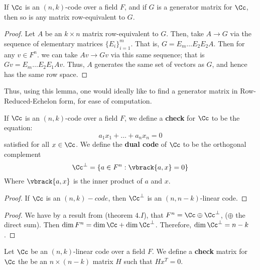 \begin{lemma}\label{2.1.1}
    If $\Cc$ is an  $(n,k)$-code over a field $F$, and if  $G$ is a generator
    matrix for  $\Cc$, then so is any matrix row-equivalent to  $G$.
\end{lemma}
\begin{proof}
    Let $A$ be an  $k \times n$ matrix row-equivalent to $G$. Then, take  $A
    \rightarrow G$ via the sequence of elementary matrices $\{E_i\}_{i=1}^m$.
    That is, $G=E_m \dots E_2E_2A$. Then for any $v \in F^n$. we can take $Av
    \rightarrow Gv$ via this same sequence; that is  $Gv=E_m \dots E_2E_1Av$.
    Thus, $A$ generates the same set of vectors as  $G$, and hence has the same
    row space.
\end{proof}
\begin{remark}
    Thus, using this lemma, one would ideally like to find a generator matrix in
    Row-Reduced-Echelon form, for ease of computation.
\end{remark}

\begin{definition}
    If $\Cc$ is an  $(n,k)$-code over a field $F$, we define a  \textbf{check}
    for $\Cc$ to be the equation:
    \begin{equation}
        a_1x_1+\dots+a_nx_n=0
    \end{equation}
    satisfied for all $x \in \Cc$. We define the \textbf{dual code} of $\Cc$ to
    be the orthogonal complement
    \begin{equation}
        \Cc^{\perp}=\{a \in F^n : \vbrack{a,x}=0\}
    \end{equation}
    Where $\vbrack{a,x}$ is the inner product of $a$ and  $x$.
\end{definition}

\begin{proof}
    If $\Cc$ is an  $(n,k)-code$, then $\Cc^\perp$ is an  $(n,n-k)$-linear code.
\end{proof}
\begin{proof}
    We have by a result from \cite{herstein} (theorem $4.I$), that $F^n=\Cc
    \oplus \Cc^\perp$, ($\oplus$ the direct sum). Then
    $\dim{F^n}=\dim{\Cc}+\dim{\Cc^\perp}$. Therefore, $\dim{\Cc^\perp}=n-k$.
\end{proof}

\begin{definition}
    Let $\Cc$ be an $(n,k)$-linear code over a field $F$. We define a
    \textbf{check} matrix for $\Cc$ the be an $n \times (n-k)$ matrix $H$ such
    that  $Hx^T=0$.
\end{definition}

